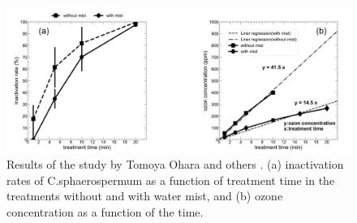 \begin{figure}
    \centering
    \includegraphics[width=1\textwidth]{images/KIT_work.png}
    \caption[Results of the study by Tomoya Ohara and others]{Results of the study by Tomoya Ohara and others \cite{kit}. (a) inactivation rates of C.sphaerospermum as a function of treatment time in the
    treatments without and with water mist, and (b) ozone concentration as a function of the
    time.}
    \label{fig:kit}
\end{figure}
